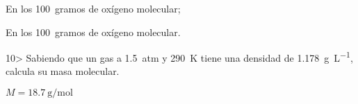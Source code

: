 \documentclass{article}
\begin{document}
\begin{solution}
  \begin{enumerate*}
    \item En los \SI{100}{gramos} de oxígeno molecular;
    \item En los \SI{100}{gramos} de oxígeno molecular.
  \end{enumerate*}
\end{solution}

\begin{exercise}
  10> Sabiendo que un gas a \SI{1,5}{atm} y \SI{290}{\kelvin} tiene una densidad de \SI{1,178}{\gram\per\liter}, calcula su masa molecular.
\end{exercise}
\begin{solution}
  $M = \SI{18,7}{\gram\per\mole}$
\end{solution}
\end{document}
